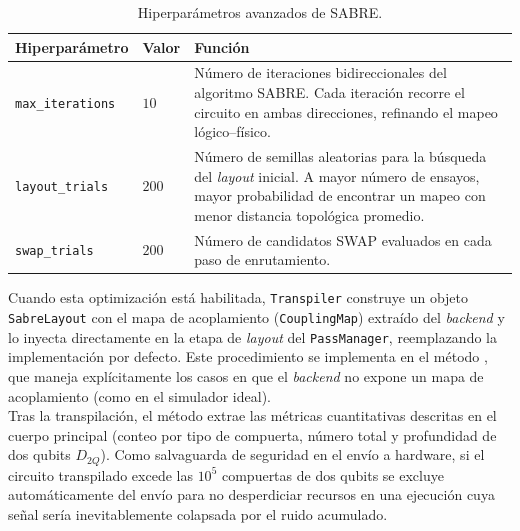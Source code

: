 \documentclass[12pt, spanish]{book}
\begin{document}
\begin{table}[H]
    \centering
    \caption{Hiperparámetros avanzados de SABRE.}
    \label{tab:sabre_avanzado}
    \footnotesize
    \begin{tabular}{p{} p{} p{}}
        \toprule
        \textbf{Hiperparámetro} & \textbf{Valor} & \textbf{Función} \\
        \midrule
        \texttt{max\_iterations}
            & $10$
            & Número de iteraciones bidireccionales del algoritmo SABRE. Cada iteración recorre el circuito en ambas direcciones, refinando el mapeo lógico--físico. \\
        \midrule
        \texttt{layout\_trials}
            & $200$
            & Número de semillas aleatorias para la búsqueda del \textit{layout} inicial. A mayor número de ensayos, mayor probabilidad de encontrar un mapeo con menor distancia topológica promedio. \\
        \midrule
        \texttt{swap\_trials}
            & $200$
            & Número de candidatos SWAP evaluados en cada paso de enrutamiento. \\
        \bottomrule
    \end{tabular}
\end{table}

Cuando esta optimización está habilitada, \texttt{Transpiler} construye un objeto \texttt{SabreLayout} con el mapa de acoplamiento (\texttt{CouplingMap}) extraído del \textit{backend} y lo inyecta directamente en la etapa de \textit{layout} del \texttt{PassManager}, reemplazando la implementación por defecto. Este procedimiento se implementa en el método , que maneja explícitamente los casos en que el \textit{backend} no expone un mapa de acoplamiento (como en el simulador ideal).\\

Tras la transpilación, el método  extrae las métricas cuantitativas descritas en el cuerpo principal (conteo por tipo de compuerta, número total y profundidad de dos qubits $D_{2Q}$). Como salvaguarda de seguridad en el envío a hardware, si el circuito transpilado excede las $10^5$ compuertas de dos qubits se excluye automáticamente del envío para no desperdiciar recursos en una ejecución cuya señal sería inevitablemente colapsada por el ruido acumulado.

\end{document}
